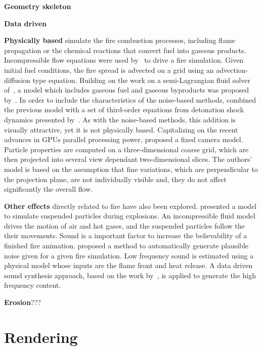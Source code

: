\textbf{Geometry skeleton}

\textbf{Data driven}

\textbf{Physically based} simulate the fire combustion processes, including flame propagation or the chemical reactions that convert fuel into gaseous products.  
Incompressible flow equations were used by~\cite{Stam:1995} to drive a fire simulation.
Given initial fuel conditions, the fire spread is advected on a grid using an advection-diffusion type equation.
Building on the work on a semi-Lagrangian fluid solver of~\cite{Stam:1999}, a model which includes gaseous fuel and gaseous byproducts was proposed by~\cite{Nguyen:2002}.
In order to include the characteristics of the noise-based methods, \cite{Hong:2007} combined the previous model with a set of third-order equations from detonation shock dynamics presented by~\cite{Yao:1996}.
As with the noise-based methods, this addition is visually attractive, yet it is not physically based. 
Capitalizing on the recent advances in GPUs parallel processing power, \cite{Horvath:2009} proposed a fixed camera model.
Particle properties are computed on a three-dimensional coarse grid, which are then projected into several view dependant two-dimensional slices.
The authors' model is based on the assumption that fine variations, which are perpendicular to the projection plane, are not individually visible and, they do not affect significantly the overall flow.
 
\textbf{Other effects} directly related to fire have also been explored.
\cite{Feldman:2003} presented a model to simulate suspended particles during explosions.
An incompressible fluid model drives the motion of air and hot gases, and the suspended particles follow the their movements.
Sound is a important factor to increase the believability of a finished fire animation.
\cite{Chadwick:2011} proposed a method to automatically generate plausible noise given for a given fire simulation.
Low frequency sound is estimated using a physical model whose inputs are the flame front and heat release.
A data driven sound synthesis approach, based on the work by~\cite{Wei:2000}, is applied to generate the high frequency content.

\textbf{Erosion}???




\section{Rendering}
\label{sec:rendering}

